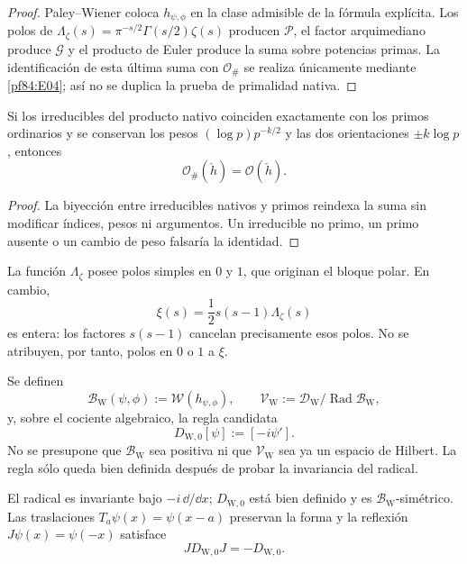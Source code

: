 \begin{proof}
Paley--Wiener coloca \(h_{\psi,\phi}\) en la clase admisible de la fórmula
explícita. Los polos de
\(\Lambda_\zeta(s)=\pi^{-s/2}\Gamma(s/2)\zeta(s)\) producen
\(\mathcal P\), el factor arquimediano produce \(\mathcal G\) y el producto
de Euler produce la suma sobre potencias primas. La identificación de esta
última suma con \(\mathcal O_\#\) se realiza únicamente mediante
\cref{pf84:E04}; así no se duplica la prueba de primalidad nativa.
\end{proof}

\begin{proposition}
\label{pf84:E04}
Si los irreducibles del producto nativo coinciden exactamente con los primos
ordinarios y se conservan los pesos
\((\log p)p^{-k/2}\) y las dos orientaciones \(\pm k\log p\), entonces
\[
 \mathcal O_\#(\check h)=\mathcal O(\check h).
\]
\end{proposition}

\begin{proof}
La biyección entre irreducibles nativos y primos reindexa la suma sin
modificar índices, pesos ni argumentos. Un irreducible no primo, un primo
ausente o un cambio de peso falsaría la identidad.
\end{proof}

\begin{remark}
\label{pf84:E05}
La función \(\Lambda_\zeta\) posee polos simples en \(0\) y \(1\), que
originan el bloque polar. En cambio,
\[
 \xi(s)=\frac12s(s-1)\Lambda_\zeta(s)
\]
es entera: los factores \(s(s-1)\) cancelan precisamente esos polos. No se
atribuyen, por tanto, polos en \(0\) o \(1\) a \(\xi\).
\end{remark}

\begin{definition}
\label{pf84:E06}
Se definen
\[
 \mathcal B_{\mathrm W}(\psi,\phi)
 :=\mathcal W(h_{\psi,\phi}),
 \qquad
 \mathcal V_{\mathrm W}:=
 \mathcal D_{\mathrm W}/\operatorname{Rad}\mathcal B_{\mathrm W},
\]
y, sobre el cociente algebraico, la regla candidata
\[
 D_{\mathrm W,0}[\psi]:=[-i\psi'].
\]
No se presupone que \(\mathcal B_{\mathrm W}\) sea positiva ni que
\(\mathcal V_{\mathrm W}\) sea ya un espacio de Hilbert. La regla sólo queda
bien definida después de probar la invariancia del radical.
\end{definition}

\begin{theorem}
\label{pf84:E07}
El radical es invariante bajo \(-i\,\dd/\dd x\);
\(D_{\mathrm W,0}\) está bien definido y es
\(\mathcal B_{\mathrm W}\)-simétrico. Las traslaciones
\(T_a\psi(x)=\psi(x-a)\) preservan la forma y la reflexión
\(J\psi(x)=\psi(-x)\) satisface
\[
 JD_{\mathrm W,0}J=-D_{\mathrm W,0}.
\]
\end{theorem}

